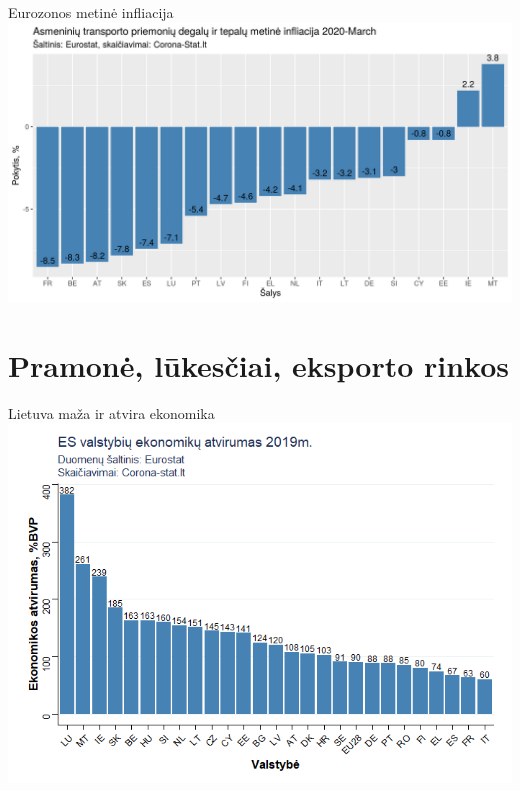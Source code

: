 \documentclass[11pt]{beamer}
\begin{document}
\begin{frame}{Eurozonos metinė infliacija}
\includegraphics[scale=0.5]{infliacija_degalai.png}
\end{frame}



\section{Pramonė, lūkesčiai, eksporto rinkos}

\begin{frame}{Lietuva maža ir atvira ekonomika}
\includegraphics[scale=0.5]{atvirumas.png}
\end{frame}
\end{document}
